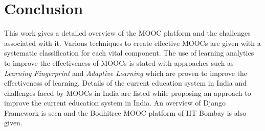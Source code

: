 \section{Conclusion}
This work gives a detailed overview of the MOOC platform and the challenges associated with it. Various techniques to create effective MOOCs are given with a systematic classification for each vital component. The use of learning analytics to improve the effectiveness of MOOCs is stated with approaches such as \emph{Learning Fingerprint} and \emph{Adaptive Learning} which are proven to improve the effectiveness of learning. Details of the current education system in India and challenges faced by MOOCs in India are listed while proposing an approach to improve the current education system in India. An overview of Django Framework is seen and the Bodhitree MOOC platform of IIT Bombay is also given.